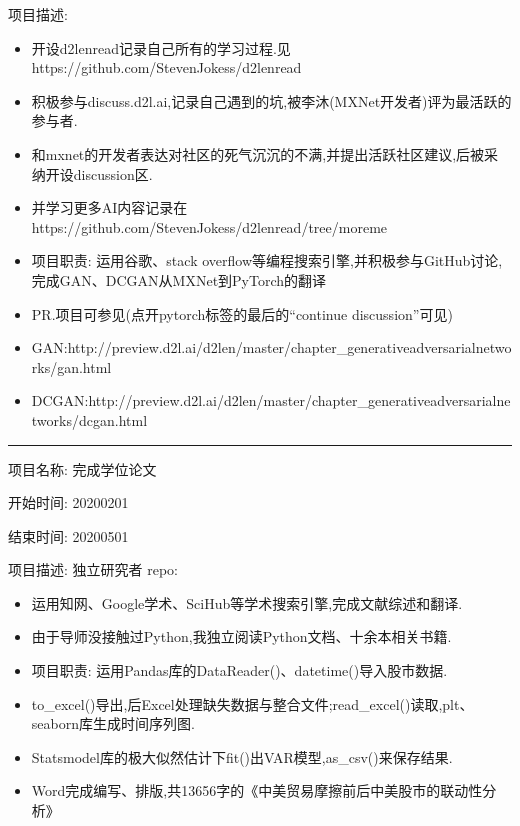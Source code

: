 \documentclass[letterpaper,11pt,english]{sphinxmanual}
\begin{document}
项目描述:
\begin{itemize}
\item {} 
开设d2l\sphinxhyphen{}en\sphinxhyphen{}read记录自己所有的学习过程.见https://github.com/StevenJokess/d2l\sphinxhyphen{}en\sphinxhyphen{}read

\item {} 
积极参与discuss.d2l.ai,记录自己遇到的坑,被李沐(MXNet开发者)评为最活跃的参与者.

\item {} 
和mxnet的开发者表达对社区的死气沉沉的不满,并提出活跃社区建议,后被采纳开设discussion区.

\item {} 
并学习更多AI内容记录在https://github.com/StevenJokess/d2l\sphinxhyphen{}en\sphinxhyphen{}read/tree/moreme

\item {} 
项目职责: 运用谷歌、stack
overflow等编程搜索引擎,并积极参与GitHub讨论,完成GAN、DCGAN从MXNet到PyTorch的翻译

\item {} 
PR.项目可参见(点开pytorch标签的最后的“continue discussion”可见)

\item {} 
GAN:http://preview.d2l.ai/d2l\sphinxhyphen{}en/master/chapter\_generative\sphinxhyphen{}adversarial\sphinxhyphen{}networks/gan.html

\item {} 
DCGAN:http://preview.d2l.ai/d2l\sphinxhyphen{}en/master/chapter\_generative\sphinxhyphen{}adversarial\sphinxhyphen{}networks/dcgan.html

\end{itemize}


\bigskip\hrule\bigskip


项目名称: 完成学位论文

开始时间: 2020\sphinxhyphen{}02\sphinxhyphen{}01

结束时间: 2020\sphinxhyphen{}05\sphinxhyphen{}01

项目描述: 独立研究者 repo: 
\begin{itemize}
\item {} 
运用知网、Google学术、SciHub等学术搜索引擎,完成文献综述和翻译.

\item {} 
由于导师没接触过Python,我独立阅读Python文档、十余本相关书籍.

\item {} 
项目职责: 运用Pandas库的DataReader()、datetime()导入股市数据.

\item {} 
to\_excel()导出,后Excel处理缺失数据与整合文件;read\_excel()读取,plt、seaborn库生成时间序列图.

\item {} 
Statsmodel库的极大似然估计下fit()出VAR模型,as\_csv()来保存结果.

\item {} 
Word完成编写、排版,共13656字的《中美贸易摩擦前后中美股市的联动性分析》

\end{itemize}
\end{document}
